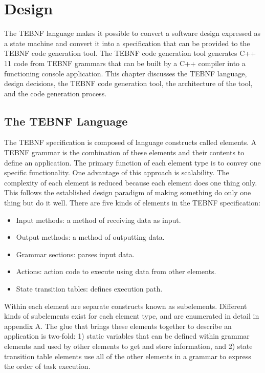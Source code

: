 \chapter{Design}
The TEBNF language makes it possible to convert a software design expressed as a state machine and convert it into a specification that can be provided to the TEBNF code generation tool.  The TEBNF code generation tool generates C++ 11 code from TEBNF grammars that can be built by a C++ compiler into a functioning console application.  This chapter discusses the TEBNF language, design decisions, the TEBNF code generation tool, the architecture of the tool, and the code generation process.

\section{The TEBNF Language}
The TEBNF specification is composed of language constructs called elements.  A TEBNF grammar is the combination of these elements and their contents to define an application.   The primary function of each element type is to convey one specific functionality.  One advantage of this approach is scalability.  The complexity of each element is reduced because each element does one thing only.  This follows the established design paradigm of making something do only one thing but do it well.  There are five kinds of elements in the TEBNF specification:
\begin{itemize}
  \item Input methods: a method of receiving data as input.
  \item Output methods: a method of outputting data.
  \item Grammar sections: parses input data. 
  \item Actions: action code to execute using data from other elements.
  \item State transition tables: defines execution path.
\end{itemize}

\indent
Within each element are separate constructs known as subelements.  Different kinds of subelements exist for each element type, and are enumerated in detail in appendix A.  The glue that brings these elements together to describe an application is two-fold: 1) static variables that can be defined within grammar elements and used by other elements to get and store information, and 2) state transition table elements use all of the other elements in a grammar to express the order of task execution.

